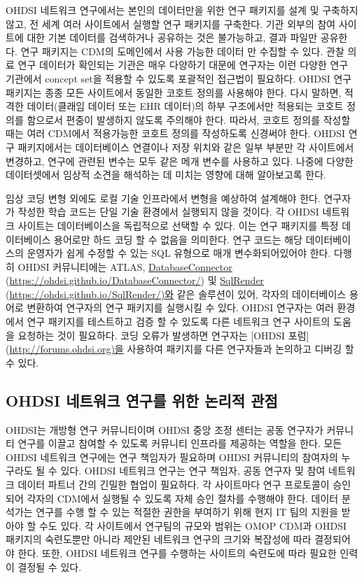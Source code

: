\documentclass[11pt]{book}
\theoremstyle{definition}
\theoremstyle{definition}
\theoremstyle{definition}
\theoremstyle{remark}
\begin{document}
OHDSI 네트워크 연구에서는 본인의 데이터만을 위한 연구 패키지를 설계 및
구축하지 않고, 전 세계 여러 사이트에서 실행할 연구 패키지를 구축한다.
기관 외부의 참여 사이트에 대한 기본 데이터를 검색하거나 공유하는 것은
불가능하고, 결과 파일만 공유한다. 연구 패키지는 CDM의 도메인에서 사용
가능한 데이터 만 수집할 수 있다. 관찰 의료 연구 데이터가 확인되는 기관은
매우 다양하기 대문에 연구자는 이런 다양한 연구 기관에서 concept set을
적용할 수 있도록 포괄적인 접근법이 필요하다. OHDSI 연구 패키지는 종종
모든 사이트에서 동일한 코호트 정의를 사용해야 한다. 다시 말하면, 적격한
데이터(클래임 데이터 또는 EHR 데이터)의 하부 구조에서만 적용되는 코호트
정의를 함으로서 편중이 발생하지 않도록 주의해야 한다. 따라서, 코호트
정의를 작성할 때는 여러 CDM에서 적용가능한 코호트 정의를 작성하도록
신경써야 한다. OHDSI 연구 패키지에서는 데이터베이스 연결이나 저장 위치와
같은 일부 부분만 각 사이트에서 변경하고, 연구에 관련된 변수는 모두 같은
메개 변수를 사용하고 있다. 나중에 다양한 데이터셋에서 임상적 소견을
해석하는 데 미치는 영향에 대해 알아보고록 한다.

임상 코딩 변형 외에도 로컬 기술 인프라에서 변형을 예상하여 설계해야
한다. 연구자가 작성한 학습 코드는 단일 기술 환경에서 실행되지 않을
것이다. 각 OHDSI 네트워크 사이트는 데이터베이스을 독립적으로 선택할 수
있다. 이는 연구 패키지를 특정 데이터베이스 용어로만 하드 코딩 할 수
없음을 의미한다. 연구 코드는 해당 데이터베이스의 운영자가 쉽게 수정할 수
있는 SQL 유형으로 매개 변수화되어있어야 한다. 다행히 OHDSI 커뮤니티에는
ATLAS, \protect\hyperlink{DatabaseConnector}{DatabaseConnector}
(\url{https://ohdsi.github.io/DatabaseConnector/}) 및
\protect\hyperlink{SqlRender}{SqlRender}
(\url{https://ohdsi.github.io/SqlRender/)와} 같은 솔루션이 있어, 각자의
데이터베이스 용어로 변환하여 연구자의 연구 패키지를 실행시킬 수 있다.
OHDSI 연구자는 여러 환경에서 연구 패키지를 테스트하고 검증 할 수 있도록
다른 네트워크 연구 사이트의 도움을 요청하는 것이 필요하다. 코딩 오류가
발생하면 연구자는 {[}OHDSI 포럼{]} (\url{http://forums.ohdsi.org)을}
사용하여 패키지를 다른 연구자들과 논의하고 디버깅 할 수 있다.

\subsection{OHDSI 네트워크 연구를 위한 논리적 관점}\label{ohdsi-----}


OHDSI는 개방형 연구 커뮤니티이며 OHDSI 중앙 조정 센터는 공동 연구자가
커뮤니티 연구를 이끌고 참여할 수 있도록 커뮤니티 인프라를 제공하는
역할을 한다. 모든 OHDSI 네트워크 연구에는 연구 책임자가 필요하며 OHDSI
커뮤니티의 참여자의 누구라도 될 수 있다. OHDSI 네트워크 연구는 연구
책임자, 공동 연구자 및 참여 네트워크 데이터 파트너 간의 긴밀한 협업이
필요하다. 각 사이트마다 연구 프로토콜이 승인되어 각자의 CDM에서 실행될
수 있도록 자체 승인 절차를 수행해야 한다. 데이터 분석가는 연구를 수행 할
수 있는 적절한 권한을 부여하기 위해 현지 IT 팀의 지원을 받아야 할 수도
있다. 각 사이트에서 연구팀의 규모와 범위는 OMOP CDM과 OHDSI 패키지의
숙련도뿐만 아니라 제안된 네트워크 연구의 크기와 복잡성에 따라 결정되어야
한다. 또한, OHDSI 네트워크 연구를 수행하는 사이트의 숙련도에 따라 필요한
인력이 결정될 수 있다.
\end{document}
